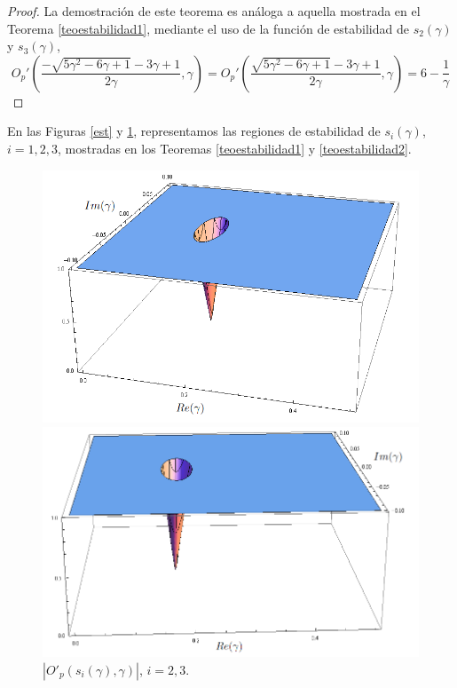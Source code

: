 \begin{proof}
La demostración de este teorema es análoga a aquella mostrada en el Teorema
\ref{teoestabilidad1}, mediante el uso de la función de estabilidad de $s_2(\gamma)$ y $s_3(\gamma)$,
$$O_{p}'\left(\frac{-\sqrt{5 \gamma ^2-6 \gamma +1}-3 \gamma +1}{2 \gamma },\gamma\right)=O_{p}'\left(\frac{\sqrt{5 \gamma ^2-6 \gamma +1}-3 \gamma +1}{2 \gamma },\gamma\right)=6-\frac{1}{\gamma } $$
\end{proof}

En las Figuras \ref{est} y \ref{estt}, representamos las regiones de estabilidad de 
$s_i(\gamma)$, $i=1,2,3$, mostradas en los Teoremas \ref{teoestabilidad1}
y \ref{teoestabilidad2}. %
\begin{figure}[h]
	\begin{minipage}[m]{0.49\linewidth}%
		\hspace{1.2cm}\includegraphics[width=.68\textwidth]{Est_ex1.png}
		\caption{$\left|O'_p\left(s_1(\gamma),\gamma\right)\right|$.}
		\label{est}
	\end{minipage}
	\begin{minipage}[m]{0.5\linewidth}%
		\hspace{1.2cm}\includegraphics[width=.7\textwidth]{Est_ex2.png}
		\caption{$\left|O'_p\left(s_i(\gamma),\gamma\right)\right|$, $i=2,3$.}
		\label{estt}
	\end{minipage}
\end{figure}
%

